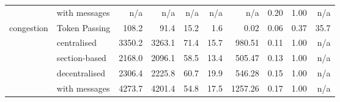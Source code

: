 \documentclass[11pt,a4paper]{article}
\begin{document}
\begin{table}[h]
\begin{tabular}{llrrrrrrrr}
               & with messages  & n/a & n/a & n/a & n/a & n/a & 0.20 & 1.00 & n/a \\
    congestion & Token Passing  & 108.2 & 91.4 & 15.2 & 1.6 & 0.02 & 0.06 & 0.37 & 35.7 \\
               & centralised    & 3350.2 & 3263.1 & 71.4 & 15.7 & 980.51 & 0.11 & 1.00 & n/a \\
               & section-based  & 2168.0 & 2096.1 & 58.5 & 13.4 & 505.47 & 0.13 & 1.00 & n/a \\
               & decentralised  & 2306.4 & 2225.8 & 60.7 & 19.9 & 546.28 & 0.15 & 1.00 & n/a \\
               & with messages  & 4273.7 & 4201.4 & 54.8 & 17.5 & 1257.26 & 0.17 & 1.00 & n/a \\
    \bottomrule
  \end{tabular}
\end{table}
\end{document}
